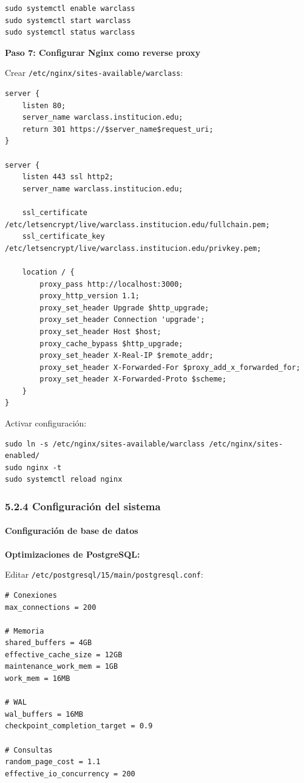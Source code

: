 \begin{verbatim}
sudo systemctl enable warclass
sudo systemctl start warclass
sudo systemctl status warclass
\end{verbatim}

\textbf{Paso 7: Configurar Nginx como reverse proxy}

Crear \texttt{/etc/nginx/sites-available/warclass}:

\begin{verbatim}
server {
    listen 80;
    server_name warclass.institucion.edu;
    return 301 https://$server_name$request_uri;
}

server {
    listen 443 ssl http2;
    server_name warclass.institucion.edu;

    ssl_certificate /etc/letsencrypt/live/warclass.institucion.edu/fullchain.pem;
    ssl_certificate_key /etc/letsencrypt/live/warclass.institucion.edu/privkey.pem;

    location / {
        proxy_pass http://localhost:3000;
        proxy_http_version 1.1;
        proxy_set_header Upgrade $http_upgrade;
        proxy_set_header Connection 'upgrade';
        proxy_set_header Host $host;
        proxy_cache_bypass $http_upgrade;
        proxy_set_header X-Real-IP $remote_addr;
        proxy_set_header X-Forwarded-For $proxy_add_x_forwarded_for;
        proxy_set_header X-Forwarded-Proto $scheme;
    }
}
\end{verbatim}

Activar configuración:

\begin{verbatim}
sudo ln -s /etc/nginx/sites-available/warclass /etc/nginx/sites-enabled/
sudo nginx -t
sudo systemctl reload nginx
\end{verbatim}

\subsubsection{5.2.4 Configuración del sistema}

\paragraph{Configuración de base de datos}

\textbf{Optimizaciones de PostgreSQL:}

Editar \texttt{/etc/postgresql/15/main/postgresql.conf}:

\begin{verbatim}
# Conexiones
max_connections = 200

# Memoria
shared_buffers = 4GB
effective_cache_size = 12GB
maintenance_work_mem = 1GB
work_mem = 16MB

# WAL
wal_buffers = 16MB
checkpoint_completion_target = 0.9

# Consultas
random_page_cost = 1.1
effective_io_concurrency = 200
\end{verbatim}

